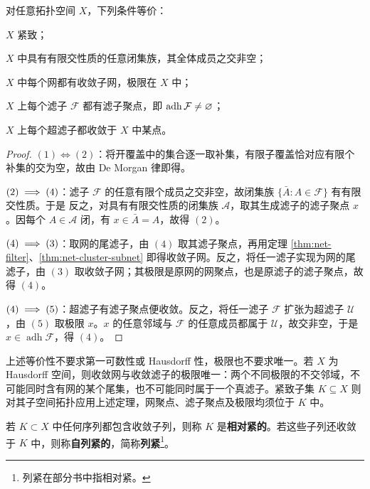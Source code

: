 \begin{samepage}
\begin{theorem}[紧致性的等价刻画]\label{thm:compact-nets-filters}
    对任意拓扑空间 $X$，下列条件等价：
    \begin{compactenum}[(1)]
        \item $X$ 紧致；
        \item $X$ 中具有有限交性质的任意闭集族，其全体成员之交非空；
        \item $X$ 中每个网都有收敛子网，极限在 $X$ 中；
        \item $X$ 上每个滤子 $\mathcal F$ 都有滤子聚点，即 $\operatorname{adh}\mathcal F\ne\varnothing$；
        \item $X$ 上每个超滤子都收敛于 $X$ 中某点。
    \end{compactenum}
\end{theorem}
\end{samepage}
\begin{proof}
    $(1)\iff(2)$：将开覆盖中的集合逐一取补集，有限子覆盖恰对应有限个补集的交为空，故由 De Morgan 律即得。

    $(2)\implies(4)$：滤子 $\mathcal F$ 的任意有限个成员之交非空，故闭集族 $\{\bar A:A\in\mathcal F\}$ 有有限交性质。于是
    反之，对具有有限交性质的闭集族 $\mathcal A$，取其生成滤子的滤子聚点 $x$。因每个 $A\in\mathcal A$ 闭，有 $x\in\bar A=A$，故得 $(2)$。

    $(4)\implies(3)$：取网的尾滤子，由 $(4)$ 取其滤子聚点，再用定理 \ref{thm:net-filter}、\ref{thm:net-cluster-subnet} 即得收敛子网。反之，将任一滤子实现为网的尾滤子，由 $(3)$ 取收敛子网；其极限是原网的网聚点，也是原滤子的滤子聚点，故得 $(4)$。

    $(4)\implies(5)$：超滤子有滤子聚点便收敛。反之，将任一滤子 $\mathcal F$ 扩张为超滤子 $\mathcal U$，由 $(5)$ 取极限 $x$。$x$ 的任意邻域与 $\mathcal F$ 的任意成员都属于 $\mathcal U$，故交非空，于是 $x\in\operatorname{adh}\mathcal F$，得 $(4)$。
\end{proof}

\begin{remark}
    上述等价性不要求第一可数性或 Hausdorff 性，极限也不要求唯一。若 $X$ 为 Hausdorff 空间，则收敛网与收敛滤子的极限唯一：两个不同极限的不交邻域，不可能同时含有网的某个尾集，也不可能同时属于一个真滤子。紧致子集 $K\subseteq X$ 则对其子空间拓扑应用上述定理，网聚点、滤子聚点及极限均须位于 $K$ 中。
\end{remark}

\begin{definition}
    若 $K\subset X$ 中任何序列都包含收敛子列，则称 $K$ 是\textbf{相对紧的}。若这些子列还收敛于 $K$ 中，则称\textbf{自列紧的}，简称\textbf{列紧}\footnote{列紧在部分书中指相对紧。}。
\end{definition}

